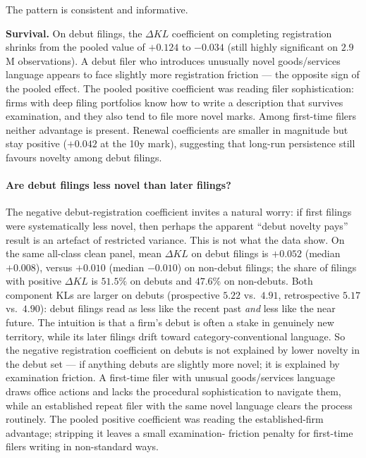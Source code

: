\documentclass[11pt]{article}
\begin{document}


The pattern is consistent and informative.

\textbf{Survival.} On debut filings, the $\Delta KL$ coefficient on
completing registration shrinks from the pooled value of $+0.124$ to
\textbf{$-0.034$} (still highly significant on $2.9$M observations). A
debut filer who introduces unusually novel goods/services language
appears to face slightly more registration friction --- the opposite
sign of the pooled effect. The pooled positive coefficient was reading
filer sophistication: firms with deep filing portfolios know how to
write a description that survives examination, and they also tend to
file more novel marks. Among first-time filers neither advantage is
present. Renewal coefficients are smaller in magnitude but stay
positive ($+0.042$ at the 10y mark), suggesting that long-run
persistence still favours novelty among debut filings.

\paragraph{Are debut filings less novel than later filings?} The negative
debut-registration coefficient invites a natural worry: if first filings
were systematically less novel, then perhaps the apparent ``debut
novelty pays'' result is an artefact of restricted variance.
This is not what the data show. On the same all-class clean panel,
mean $\Delta KL$ on debut filings is $+0.052$ (median $+0.008$), versus
$+0.010$ (median $-0.010$) on non-debut filings; the share of filings
with positive $\Delta KL$ is $51.5\%$ on debuts and $47.6\%$ on
non-debuts. Both component KLs are larger on debuts (prospective $5.22$
vs.\ $4.91$, retrospective $5.17$ vs.\ $4.90$): debut filings read as
less like the recent past \emph{and} less like the near future. The
intuition is that a firm's debut is often a stake in genuinely new
territory, while its later filings drift toward category-conventional
language. So the negative registration coefficient on debuts is not
explained by lower novelty in the debut set --- if anything debuts are
slightly more novel; it is explained by examination friction. A
first-time filer with unusual goods/services language draws office
actions and lacks the procedural sophistication to navigate them, while
an established repeat filer with the same novel language clears the
process routinely. The pooled positive coefficient was reading the
established-firm advantage; stripping it leaves a small examination-
friction penalty for first-time filers writing in non-standard ways.
\end{document}
